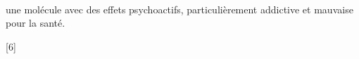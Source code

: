 \teteTermStssOrga
\nomPrenom

\begin{center}
  \chemfigHaworth{!\cocaineHaw} \\[8pt]
   une molécule avec des effets psychoactifs, particulièrement addictive et mauvaise pour la santé.
\end{center}

[6]